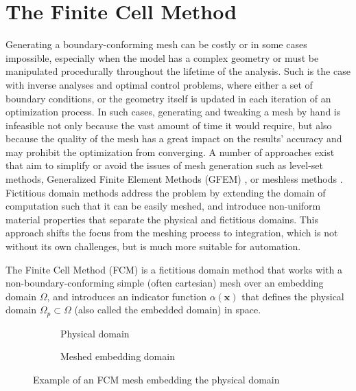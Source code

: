 %
\section{The Finite Cell Method}
\label{section:fcm}
%

Generating a boundary-conforming mesh can be costly or in some cases impossible,
especially when the model has a complex geometry or must be manipulated procedurally throughout the lifetime
of the analysis.
Such is the case with inverse analyses and optimal control problems, where either
a set of boundary conditions, or the geometry itself is updated in each iteration of an
optimization process. In such cases, generating and tweaking a mesh by hand is infeasible not only because the vast amount of time it would require, but also because the quality of the mesh has a great impact on the results' accuracy and may prohibit the optimization from converging. A number of approaches exist that aim to simplify or avoid the issues of mesh generation such as level-set methods, Generalized Finite Element Methods (GFEM) \cite{Babuska2004}, or meshless methods \cite{Chen2006}. Fictitious domain methods address the problem by extending the domain of computation such that it can be easily meshed, and introduce non-uniform material properties that separate the physical and fictitious domains. This approach shifts the focus from the meshing process to integration, which is not
without its own challenges, but is much more suitable for automation.

The Finite Cell Method (FCM) is a fictitious domain method that works with a non-boundary-conforming
simple (often cartesian) mesh over an embedding domain  $\Omega$, and introduces an indicator function $\alpha(\mathbf x)$ that defines the
physical domain $\Omega_p \subset \Omega$ (also called the embedded domain) in space. 

\begin{figure}[h] \label{fig:fcm_potato}
	\centering
	\begin{subfigure}[t]{0.49\textwidth}
		\centering
		\caption{Physical domain}
	\end{subfigure}
	\begin{subfigure}[t]{0.49\textwidth}
		\centering
		\caption{Meshed embedding domain}
	\end{subfigure}
\caption{Example of an FCM mesh embedding the physical domain}
\end{figure}


